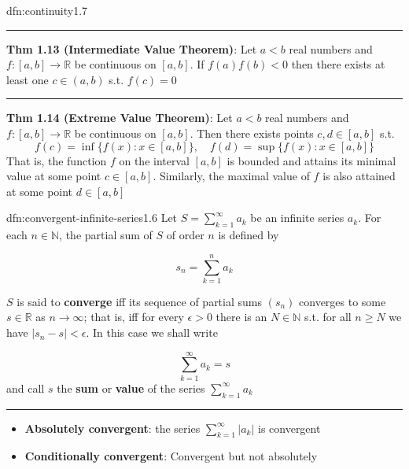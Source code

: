 \documentclass[landscape, 8pt]{extarticle}
\begin{document}
\begin{multicols}{3}
\begin{dfn}[Continuity]{dfn:continuity}{1.7}
	\vspace{-5pt}
	\noindent\rule{\textwidth}{0.2pt}

	\textbf{Thm 1.13 (Intermediate Value Theorem)}: Let $a < b$ real numbers and $f : [a, b] \to \mathbb{R}$ be continuous on $[a, b]$. If $f(a)f(b)<0$ then there exists at least one $c\in (a, b)$ s.t. $f(c) = 0$

	\noindent\rule{\textwidth}{0.2pt}

	\textbf{Thm 1.14 (Extreme Value Theorem)}: Let $a < b$ real numbers and $f : [a, b]\to \mathbb{R}$ be continuous on $[a, b]$. Then there exists points $c, d\in [a,b]$ s.t.
	\[f(c) = \inf \{f(x) : x\in [a, b]\}, \quad f(d) = \sup \{f(x) : x\in [a, b]\}\]
	That is, the function $f$ on the interval $[a, b]$ is bounded and attains its minimal value at some point $c\in [a,b]$. Similarly, the maximal value of $f$ is also attained at some point $d\in [a,b]$
\end{dfn}

\vspace{-7pt}
\begin{dfn}{dfn:convergent-infinite-series}{1.6}
	\vspace{-5pt}
	Let $S=\sum_{k=1}^{\infty}a_{k}$ be an infinite series $a_{k}$. For each $n\in\mathbb{N}$, the partial sum of $S$ of order $n$ is defined by

	\vspace{-8pt}
	\[s_{n} = \sum_{k=1}^{n} a_{k}\]

	\vspace{-5pt}
	$S$ is said to \textbf{converge} iff its sequence of partial sums $(s_{n})$ converges to some $s \in\mathbb{R}$ as $n\to\infty$; that is, iff for every $\epsilon>0$ there is an $N\in\mathbb{N}$ s.t. for all $n\ge N$ we have $\lvert s_{n}-s \rvert < \epsilon$. In this case we shall write

	\vspace{-7pt}
	\[\sum_{k=1}^{\infty} a_{k} = s\]
	\vspace{-3pt}
	and call $s$ the \textbf{sum} or \textbf{value} of the series $\sum_{k=1}^{\infty}a_{k}$

	\noindent\rule{\textwidth}{0.2pt}

	\vspace{-5pt}
	\begin{itemize}[leftmargin=*]
	    \setlength\itemsep{0em}
	    \item \textbf{Absolutely convergent}: the series $\sum_{k = 1}^{\infty} \lvert a_{k} \rvert$ is convergent
	    \item \textbf{Conditionally convergent}: Convergent but not absolutely
	\end{itemize}
\end{dfn}



\end{multicols}
\end{document}
